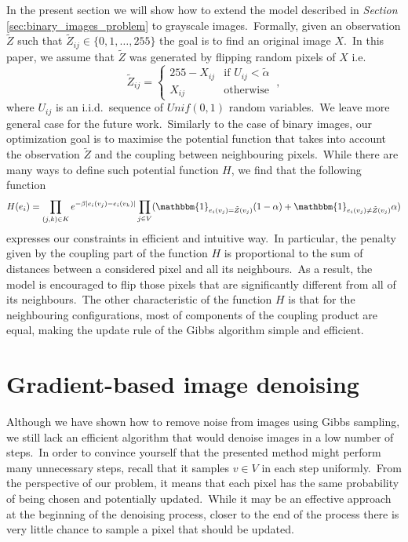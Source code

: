 \documentclass[shortabstract, english, lic]{iithesis}
\newcommand\numberedchapter[1]{\setlength\topskip{3cm}\chapter{#1}\setlength\topskip{0cm}}
\theoremstyle{default_theorem_style}\newtheorem{theorem}{Theorem}
\theoremstyle{default_theorem_style}\newtheorem{definition}{Definition}
\begin{document}
In the present section we will show how to extend the model described in \textit{Section}
\ref{sec:binary_images_problem} to grayscale images.\ Formally, given an observation $\tilde{Z}$ such
that $\tilde{Z}_{ij} \in \{0, 1, \dots, 255\}$ the goal is to find an original image $X$.\ In this paper, we assume
that $\tilde{Z}$ was generated by flipping random pixels of $X$ i.e.
$$
\tilde{Z}_{ij} =
\begin{cases}
  255 - X_{ij} &\text{if $U_{ij} < \tilde{\alpha}$}\\
  X_{ij} &\text{otherwise}
\end{cases}\ ,
$$
where $U_{ij}$ is an i.i.d.\ sequence of $Unif(0, 1)$ random variables.\ We leave more general case for the future
work.\ Similarly to the case of binary images, our optimization goal is to maximise the potential function that
takes into account the observation $\tilde{Z}$ and the coupling between neighbouring pixels.\ While there are many
ways to define such potential function $H$, we find that the following function
$$
H(e_i) = \prod\limits_{(j, k) \in K} e^{-\beta |e_i(v_j) - e_i(v_k)|}
\prod\limits_{j \in V}(\mathbbm{1}_{e_i(v_j) = \tilde{Z}(v_j)}(1 - \alpha) +
\mathbbm{1}_{e_i(v_j) \neq \tilde{Z}(v_j)}\alpha)
$$
expresses our constraints in efficient and intuitive way.\ In particular, the penalty given by the coupling part of
the function $H$ is proportional to the sum of distances between a considered pixel and all its neighbours.\ As a
result, the model is encouraged to flip those pixels that are significantly different from all of its
neighbours.\ The other characteristic of the function $H$ is that for the neighbouring configurations, most of
components of the coupling product are equal, making the update rule of the Gibbs algorithm simple and efficient.

\numberedchapter{Gradient-based image denoising}

Although we have shown how to remove noise from images using Gibbs sampling, we still lack an efficient algorithm
that would denoise images in a low number of steps.\ In order to convince yourself that the presented method
might perform many unnecessary steps, recall that it samples $v \in V$ in each step uniformly.\ From the perspective
of our problem, it means that each pixel has the same probability of being chosen and potentially updated.\ While
it may be an effective approach at the beginning of the denoising process, closer to the end of the process there is
very little chance to sample a pixel that should be updated.\newline
\end{document}
